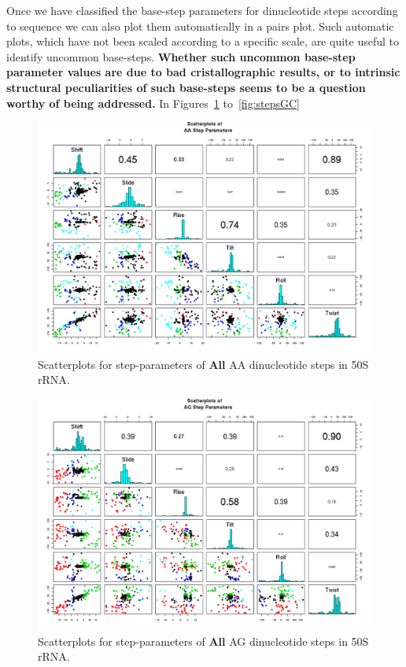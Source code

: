 Once we have classified the base-step parameters for dinucleotide
steps according to sequence we can also plot them automatically in a
pairs plot. Such automatic plots, which have not been scaled according
to a specific scale, are quite useful to identify uncommon
base-steps. \textbf{Whether such uncommon base-step parameter values are due
to bad cristallographic results, or to intrinsic structural
peculiarities of such base-steps seems to be a question worthy of being addressed.}
In Figures~\ref{fig:stepsAA} to~\ref{fig:stepsGC}


\begin{figure}[H]
\centering
\includegraphics[angle=90, scale=0.6]{All/AA.png}
\caption{Scatterplots for step-parameters of \textbf{All} AA dinucleotide steps
in 50S rRNA.}
\label{fig:stepsAA}
\end{figure}

\begin{figure}[H]
\centering
\includegraphics[angle=90, scale=0.6]{All/AG.png}
\caption{Scatterplots for step-parameters of \textbf{All} AG dinucleotide steps
in 50S rRNA.}
\label{fig:stepsAG}
\end{figure}

